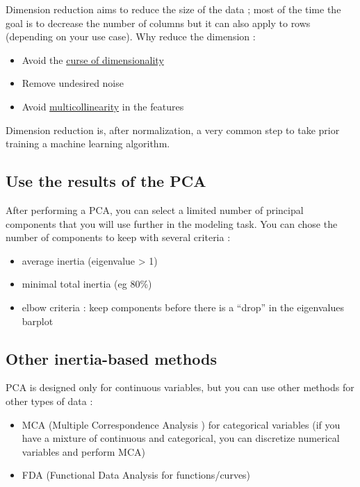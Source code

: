 \documentclass[
]{book}
\providecommand{\tightlist}{%
  \setlength{\itemsep}{0pt}\setlength{\parskip}{0pt}}
\begin{document}
Dimension reduction aims to reduce the size of the data ; most of the time the goal is to decrease the number of columns but it can also apply to rows (depending on your use case). Why reduce the dimension :

\begin{itemize}
\tightlist
\item
  Avoid the \href{https://en.wikipedia.org/wiki/Curse_of_dimensionality}{curse of dimensionality}
\item
  Remove undesired noise
\item
  Avoid \href{https://en.wikipedia.org/wiki/Multicollinearity}{multicollinearity} in the features
\end{itemize}

Dimension reduction is, after normalization, a very common step to take prior training a machine learning algorithm.

\hypertarget{use-the-results-of-the-pca}{%
\subsection{Use the results of the PCA}\label{use-the-results-of-the-pca}}

After performing a PCA, you can select a limited number of principal components that you will use further in the modeling task. You can chose the number of components to keep with several criteria :

\begin{itemize}
\tightlist
\item
  average inertia (eigenvalue \textgreater{} 1)
\item
  minimal total inertia (eg 80\%)
\item
  elbow criteria : keep components before there is a ``drop'' in the eigenvalues barplot
\end{itemize}

\hypertarget{other-inertia-based-methods}{%
\subsection{Other inertia-based methods}\label{other-inertia-based-methods}}

PCA is designed only for continuous variables, but you can use other methods for other types of data :

\begin{itemize}
\tightlist
\item
  MCA (Multiple Correspondence Analysis ) for categorical variables (if you have a mixture of continuous and categorical, you can discretize numerical variables and perform MCA)
\item
  FDA (Functional Data Analysis for functions/curves)
\end{itemize}
\end{document}
